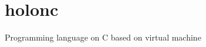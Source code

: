 \chapter{holonc }
\hypertarget{md_README}{}\label{md_README}
\label{md_README_autotoc_md0}%
%


Programming language on C based on virtual machine 